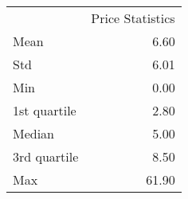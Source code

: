 \begin{tabular}{lr}
 & Price Statistics \\
Mean & 6.60 \\
Std & 6.01 \\
Min & 0.00 \\
1st quartile & 2.80 \\
Median & 5.00 \\
3rd quartile & 8.50 \\
Max & 61.90 \\
\end{tabular}
